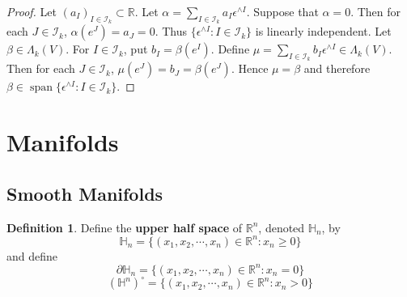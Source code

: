 \documentclass[12pt]{amsart}
\theoremstyle{definition}
\newtheorem{defn}[definition]{Definition}
\newcommand{\al}{\alpha}
\newcommand{\bet}{\beta}
\newcommand{\Lam}{\Lambda}
\newcommand{\ep}{\epsilon}
\renewcommand{\H}{\mathbb{H}}
\newcommand{\R}{\mathbb{R}}
\newcommand{\MI}{\mathcal{I}}
\DeclareMathOperator{\spn}{span}
\begin{document}
	\begin{proof}
		Let $(a_I)_{I \in \MI_k} \subset \R$. Let $\al = \sum\limits_{I \in \MI_k}a_I \ep^{\wedge I} $. Suppose that $\al = 0$. Then for each $J \in \MI_k$, $\al(e^J) = a_J = 0$. Thus $\{\ep^{\wedge I} : I \in \MI_k\}$ is linearly independent. Let $\bet \in \Lam_k(V)$. For $I \in \MI_k$, put $b_I = \bet(e^I)$. Define $\mu = \sum\limits_{I \in \MI_k} b_I\ep^{\wedge I} \in \Lam_k(V)$. Then for each $J \in \MI_k$, $\mu(e^J) = b_J = \bet(e^J)$. Hence $\mu = \bet$ and therefore $\bet \in \spn \{\ep^{\wedge I} :I \in \MI_k\}$.
	\end{proof}
	
	
	
	
	
	
	
	
	
	
	
	
	
	
	
	
	
	
	
	
	
	
	
	
	
	
	
	
	
	
	
	
	
	
	
	
	
	
	

	\newpage
	
	\section{Manifolds}
	
	\subsection{Smooth Manifolds}
	
	\begin{defn}
		Define the \textbf{upper half space} of $\R^n$, denoted $\H_n$, by $$\H_n = \{(x_1, x_2, \cdots, x_n) \in \R^n: x_n \geq 0\}$$ and define $$\partial\H_n = \{(x_1, x_2, \cdots, x_n) \in \R^n: x_n = 0\}$$ 
		$$(\H^n)^{\circ} = \{(x_1, x_2, \cdots, x_n) \in \R^n: x_n > 0\}$$
	\end{defn}
	
\end{document}
